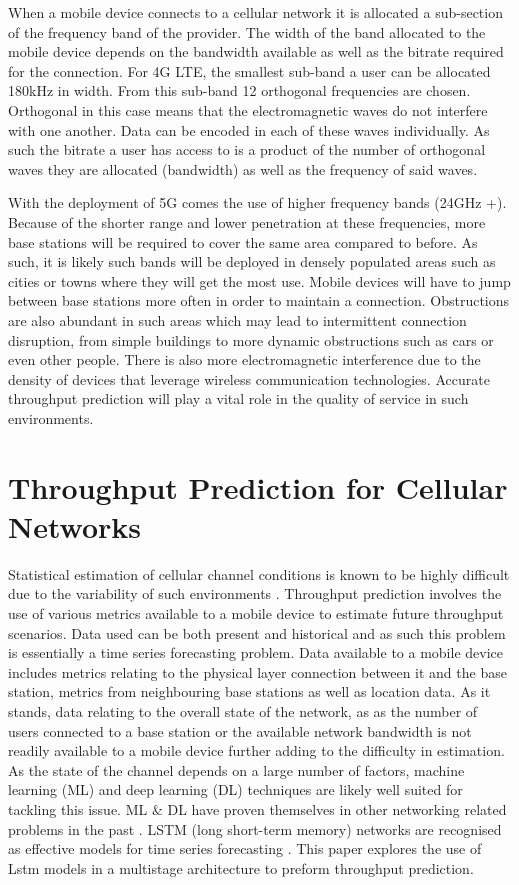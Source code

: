 When a mobile device connects to a cellular network it is allocated a sub-section of the frequency band of the provider. The width of the band allocated to the mobile device depends on the bandwidth available as well as the bitrate required for the connection. For 4G LTE, the smallest sub-band a user can be allocated 180kHz in width. From this sub-band 12 orthogonal frequencies are chosen. Orthogonal in this case means that the electromagnetic waves do not interfere with one another. Data can be encoded in each of these waves individually. As such the bitrate a user has access to is a product of the number of orthogonal waves they are allocated (bandwidth) as well as the frequency of said waves.

With the deployment of 5G comes the use of higher frequency bands (24GHz +). Because of the shorter range and lower penetration at these frequencies, more base stations will be required to cover the same area compared to before. As such, it is likely such bands will be deployed in densely populated areas such as cities or towns where they will get the most use. Mobile devices will have to jump between base stations more often in order to maintain a connection. Obstructions are also abundant in such areas which may lead to intermittent connection disruption, from simple buildings to more dynamic obstructions such as cars or even other people. There is also more electromagnetic interference due to the density of devices that leverage wireless communication technologies. Accurate throughput prediction will play a vital role in the quality of service in such environments.


\section{Throughput Prediction for Cellular Networks}

Statistical estimation of cellular channel conditions is known to be highly difficult due to the variability of such environments \cite{10.1145/2785956.2787498}. Throughput prediction involves the use of various metrics available to a mobile device to estimate future throughput scenarios. Data used can be both present and historical and as such this problem is essentially a time series forecasting problem. Data available to a mobile device includes metrics relating to the physical layer connection between it and the base station, metrics from neighbouring base stations as well as location data. As it stands, data relating to the overall state of the network, as as the number of users connected to a base station or the available network bandwidth is not readily available to a mobile device further adding to the difficulty in estimation. As the state of the channel depends on a large number of factors, machine learning (ML) and deep learning (DL) techniques are likely well suited for tackling this issue. ML \& DL have proven themselves in other networking related problems in the past \cite{8666641}. LSTM (long short-term memory) networks are recognised as effective models for time series forecasting \cite{8614252}. This paper explores the use of Lstm models in a multistage architecture to preform throughput prediction.
